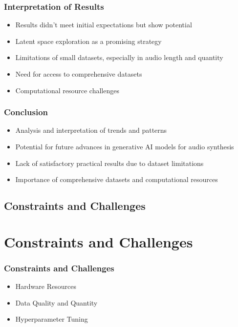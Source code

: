 \begin{frame}
    \frametitle{Interpretation of Results}

    \begin{itemize}
        \item Results didn't meet initial expectations but show potential
        \item Latent space exploration as a promising strategy
        \item Limitations of small datasets, especially in audio length and quantity
        \item Need for access to comprehensive datasets
        \item Computational resource challenges
    \end{itemize}
    
\end{frame}

\begin{frame}
    \frametitle{Conclusion}

    \begin{itemize}
        \item Analysis and interpretation of trends and patterns
        \item Potential for future advances in generative AI models for audio synthesis
        \item Lack of satisfactory practical results due to dataset limitations
        \item Importance of comprehensive datasets and computational resources
    \end{itemize}
    
\end{frame}

\subsection{Constraints and Challenges}

\section{Constraints and Challenges} \label{sec:res-limitations}

\begin{frame}
    \frametitle{Constraints and Challenges}
    
    \begin{itemize}
        \item Hardware Resources
        \item Data Quality and Quantity
        \item Hyperparameter Tuning
    \end{itemize}
    
\end{frame}

